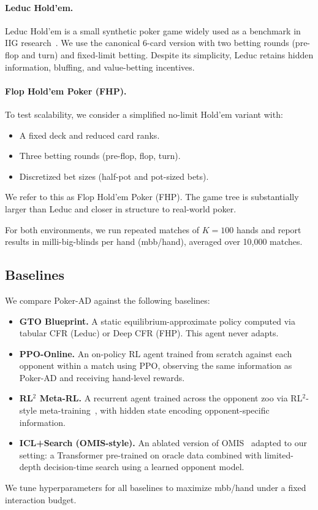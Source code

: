 \documentclass{article}
\begin{document}
\paragraph{Leduc Hold'em.}
Leduc Hold'em is a small synthetic poker game widely used as a benchmark in IIG research~\citep{heinrich2015fsp,neller2013cfrintro}. We use the canonical 6-card version with two betting rounds (pre-flop and turn) and fixed-limit betting. Despite its simplicity, Leduc retains hidden information, bluffing, and value-betting incentives.

\paragraph{Flop Hold'em Poker (FHP).}
To test scalability, we consider a simplified no-limit Hold'em variant with:
\begin{itemize}[leftmargin=*]
    \item A fixed deck and reduced card ranks.
    \item Three betting rounds (pre-flop, flop, turn).
    \item Discretized bet sizes (half-pot and pot-sized bets).
\end{itemize}
We refer to this as Flop Hold'em Poker (FHP). The game tree is substantially larger than Leduc and closer in structure to real-world poker.

For both environments, we run repeated matches of $K=100$ hands and report results in milli-big-blinds per hand (mbb/hand), averaged over 10{,}000 matches.

\subsection{Baselines}
\label{sec:baselines}

We compare Poker-AD against the following baselines:
\begin{itemize}[leftmargin=*]
    \item \textbf{GTO Blueprint.} A static equilibrium-approximate policy computed via tabular CFR (Leduc) or Deep CFR (FHP). This agent never adapts.
    \item \textbf{PPO-Online.} An on-policy RL agent trained from scratch against each opponent within a match using PPO, observing the same information as Poker-AD and receiving hand-level rewards.
    \item \textbf{RL$^2$ Meta-RL.} A recurrent agent trained across the opponent zoo via RL$^2$-style meta-training~\citep{duan2016rl2}, with hidden state encoding opponent-specific information.
    \item \textbf{ICL+Search (OMIS-style).} An ablated version of OMIS~\citep{jing2024omis} adapted to our setting: a Transformer pre-trained on oracle data combined with limited-depth decision-time search using a learned opponent model.
\end{itemize}
We tune hyperparameters for all baselines to maximize mbb/hand under a fixed interaction budget.
\end{document}
